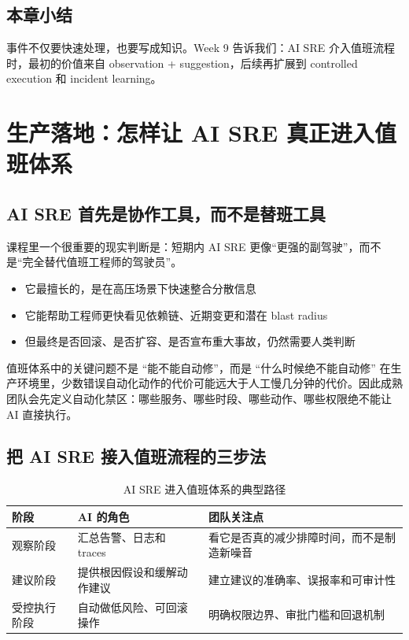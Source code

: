 \documentclass[a4paper]{article}
\begin{document}
\subsection{本章小结}

事件不仅要快速处理，也要写成知识。Week 9 告诉我们：AI SRE 介入值班流程时，最初的价值来自 observation + suggestion，后续再扩展到 controlled execution 和 incident learning。

\section{生产落地：怎样让 AI SRE 真正进入值班体系}

\subsection{AI SRE 首先是协作工具，而不是替班工具}

课程里一个很重要的现实判断是：短期内 AI SRE 更像“更强的副驾驶”，而不是“完全替代值班工程师的驾驶员”。

\begin{itemize}
    \item 它最擅长的，是在高压场景下快速整合分散信息
    \item 它能帮助工程师更快看见依赖链、近期变更和潜在 blast radius
    \item 但最终是否回滚、是否扩容、是否宣布重大事故，仍然需要人类判断
\end{itemize}

\begin{importantbox}{值班体系中的关键问题不是 ``能不能自动修''，而是 ``什么时候绝不能自动修''}
在生产环境里，少数错误自动化动作的代价可能远大于人工慢几分钟的代价。因此成熟团队会先定义自动化禁区：哪些服务、哪些时段、哪些动作、哪些权限绝不能让 AI 直接执行。
\end{importantbox}

\subsection{把 AI SRE 接入值班流程的三步法}

\begin{table}[H]
\centering
\begin{tabular}{p{} p{} p{}}
\toprule
阶段 & AI 的角色 & 团队关注点 \\
\midrule
观察阶段 & 汇总告警、日志和 traces & 看它是否真的减少排障时间，而不是制造新噪音 \\
建议阶段 & 提供根因假设和缓解动作建议 & 建立建议的准确率、误报率和可审计性 \\
受控执行阶段 & 自动做低风险、可回滚操作 & 明确权限边界、审批门槛和回退机制 \\
\bottomrule
\end{tabular}
\caption{AI SRE 进入值班体系的典型路径}
\end{table}
\end{document}
